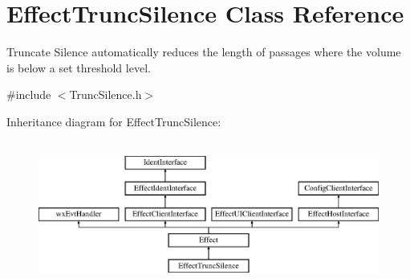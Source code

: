 \hypertarget{class_effect_trunc_silence}{}\section{Effect\+Trunc\+Silence Class Reference}
\label{class_effect_trunc_silence}


Truncate Silence automatically reduces the length of passages where the volume is below a set threshold level.  




{\ttfamily \#include $<$Trunc\+Silence.\+h$>$}

Inheritance diagram for Effect\+Trunc\+Silence\+:\begin{figure}[H]
\begin{center}
\leavevmode
\includegraphics[height=4.794520cm]{class_effect_trunc_silence}
\end{center}
\end{figure}
